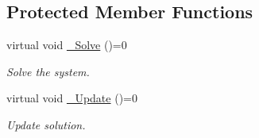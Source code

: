 \subsection*{Protected Member Functions}
\begin{DoxyCompactItemize}
\item 
\hypertarget{classvoom_1_1_solver_a88aba2b47992d687337aa2895a09576d}{
virtual void \hyperlink{classvoom_1_1_solver_a88aba2b47992d687337aa2895a09576d}{\_\-Solve} ()=0}
\label{classvoom_1_1_solver_a88aba2b47992d687337aa2895a09576d}

\begin{DoxyCompactList}\small\item\em Solve the system. \item\end{DoxyCompactList}\item 
\hypertarget{classvoom_1_1_solver_a7c9c2f8bc60be39518782daf4eae6f71}{
virtual void \hyperlink{classvoom_1_1_solver_a7c9c2f8bc60be39518782daf4eae6f71}{\_\-Update} ()=0}
\label{classvoom_1_1_solver_a7c9c2f8bc60be39518782daf4eae6f71}

\begin{DoxyCompactList}\small\item\em Update solution. \item\end{DoxyCompactList}\end{DoxyCompactItemize}
